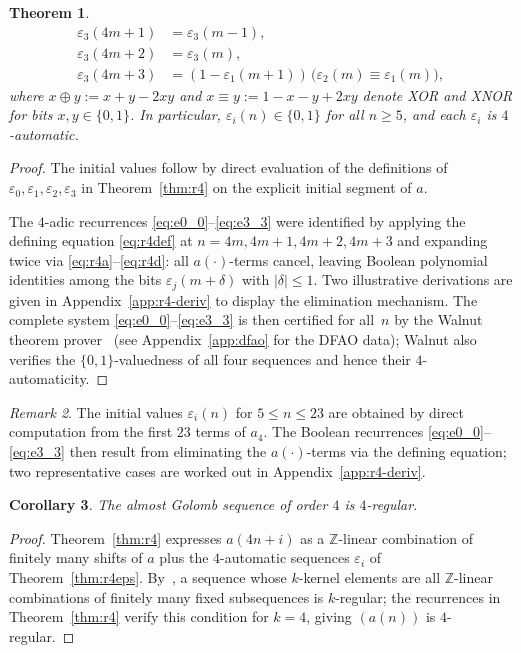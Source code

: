 \documentclass[12pt]{article}
\newtheorem{theorem}{Theorem}[section]
\newtheorem{corollary}[theorem]{Corollary}
\theoremstyle{definition}
\theoremstyle{remark}
\newtheorem{remark}[theorem]{Remark}
\newcommand{\Z}{\mathbb{Z}}
\begin{document}
\begin{theorem}
\begin{align}
\varepsilon_3(4m+1) &= \varepsilon_3(m-1), \label{eq:e3_1}\\
\varepsilon_3(4m+2) &= \varepsilon_3(m), \label{eq:e3_2}\\
\varepsilon_3(4m+3) &= (1-\varepsilon_1(m+1))\,\bigl(\varepsilon_2(m)\equiv \varepsilon_1(m)\bigr), \label{eq:e3_3}
\end{align}
where $x\oplus y := x+y-2xy$ and $x\equiv y := 1-x-y+2xy$ denote XOR and XNOR
for bits $x,y\in\{0,1\}$.
In particular, $\varepsilon_i(n)\in\{0,1\}$ for all $n\ge 5$, and each $\varepsilon_i$
is $4$-automatic.
\end{theorem}

\begin{proof}
The initial values follow by direct evaluation of the definitions of
$\varepsilon_0,\varepsilon_1,\varepsilon_2,\varepsilon_3$ in Theorem~\ref{thm:r4}
on the explicit initial segment of $a$.

The $4$-adic recurrences \eqref{eq:e0_0}--\eqref{eq:e3_3} were identified
by applying the defining equation \eqref{eq:r4def} at $n=4m,4m+1,4m+2,4m+3$
and expanding twice via \eqref{eq:r4a}--\eqref{eq:r4d}: all $a(\cdot)$-terms
cancel, leaving Boolean polynomial identities among the bits
$\varepsilon_j(m+\delta)$ with $|\delta|\le 1$.
Two illustrative derivations are given in Appendix~\ref{app:r4-deriv}
to display the elimination mechanism.
The complete system \eqref{eq:e0_0}--\eqref{eq:e3_3} is then certified
for all~$n$ by the Walnut theorem prover~\cite{Shallit2022}
(see Appendix~\ref{app:dfao} for the DFAO data);
Walnut also verifies the $\{0,1\}$-valuedness of all four sequences
and hence their $4$-automaticity.
\end{proof}

\begin{remark}
The initial values $\varepsilon_i(n)$ for $5\le n\le 23$ are obtained by
direct computation from the first $23$ terms of $a_4$. The Boolean
recurrences \eqref{eq:e0_0}--\eqref{eq:e3_3} then result from
eliminating the $a(\cdot)$-terms via the defining equation; two
representative cases are worked out in Appendix~\ref{app:r4-deriv}.
\end{remark}

\begin{corollary}\label{cor:r4regular}
The almost Golomb sequence of order $4$ is $4$-regular.
\end{corollary}

\begin{proof}
Theorem~\ref{thm:r4} expresses $a(4n+i)$ as a $\Z$-linear combination of
finitely many shifts of $a$ plus the $4$-automatic sequences $\varepsilon_i$
of Theorem~\ref{thm:r4eps}. By~\cite[Theorem~2.5]{AS92}, a sequence whose
$k$-kernel elements are all $\mathbb{Z}$-linear combinations of finitely many
fixed subsequences is $k$-regular; the recurrences in Theorem~\ref{thm:r4}
verify this condition for $k=4$, giving $(a(n))$ is $4$-regular.
\end{proof}
\end{document}
